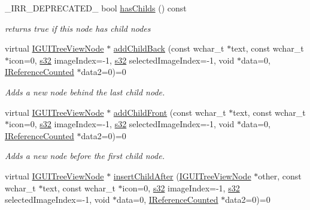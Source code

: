 \begin{DoxyCompactItemize}
\+\_\+\+I\+R\+R\+\_\+\+D\+E\+P\+R\+E\+C\+A\+T\+E\+D\+\_\+ bool \hyperlink{classirr_1_1gui_1_1IGUITreeViewNode_a7a771fc86d39a62487184bc56bcf8c52}{has\+Childs} () const
\begin{DoxyCompactList}\small\item\em returns true if this node has child nodes \end{DoxyCompactList}\item 
virtual \hyperlink{classirr_1_1gui_1_1IGUITreeViewNode}{I\+G\+U\+I\+Tree\+View\+Node} $\ast$ \hyperlink{classirr_1_1gui_1_1IGUITreeViewNode_ad0a5242042cbee79d024315e80c6db33}{add\+Child\+Back} (const wchar\+\_\+t $\ast$text, const wchar\+\_\+t $\ast$icon=0, \hyperlink{namespaceirr_ac66849b7a6ed16e30ebede579f9b47c6}{s32} image\+Index=-\/1, \hyperlink{namespaceirr_ac66849b7a6ed16e30ebede579f9b47c6}{s32} selected\+Image\+Index=-\/1, void $\ast$data=0, \hyperlink{classirr_1_1IReferenceCounted}{I\+Reference\+Counted} $\ast$data2=0)=0
\begin{DoxyCompactList}\small\item\em Adds a new node behind the last child node. \end{DoxyCompactList}\item 
virtual \hyperlink{classirr_1_1gui_1_1IGUITreeViewNode}{I\+G\+U\+I\+Tree\+View\+Node} $\ast$ \hyperlink{classirr_1_1gui_1_1IGUITreeViewNode_a537f7bb8138f4dd416a5dcfe075f85c7}{add\+Child\+Front} (const wchar\+\_\+t $\ast$text, const wchar\+\_\+t $\ast$icon=0, \hyperlink{namespaceirr_ac66849b7a6ed16e30ebede579f9b47c6}{s32} image\+Index=-\/1, \hyperlink{namespaceirr_ac66849b7a6ed16e30ebede579f9b47c6}{s32} selected\+Image\+Index=-\/1, void $\ast$data=0, \hyperlink{classirr_1_1IReferenceCounted}{I\+Reference\+Counted} $\ast$data2=0)=0
\begin{DoxyCompactList}\small\item\em Adds a new node before the first child node. \end{DoxyCompactList}\item 
virtual \hyperlink{classirr_1_1gui_1_1IGUITreeViewNode}{I\+G\+U\+I\+Tree\+View\+Node} $\ast$ \hyperlink{classirr_1_1gui_1_1IGUITreeViewNode_abe890d4fde00a4a78fd5f2e39e104338}{insert\+Child\+After} (\hyperlink{classirr_1_1gui_1_1IGUITreeViewNode}{I\+G\+U\+I\+Tree\+View\+Node} $\ast$other, const wchar\+\_\+t $\ast$text, const wchar\+\_\+t $\ast$icon=0, \hyperlink{namespaceirr_ac66849b7a6ed16e30ebede579f9b47c6}{s32} image\+Index=-\/1, \hyperlink{namespaceirr_ac66849b7a6ed16e30ebede579f9b47c6}{s32} selected\+Image\+Index=-\/1, void $\ast$data=0, \hyperlink{classirr_1_1IReferenceCounted}{I\+Reference\+Counted} $\ast$data2=0)=0

\end{DoxyCompactItemize}
